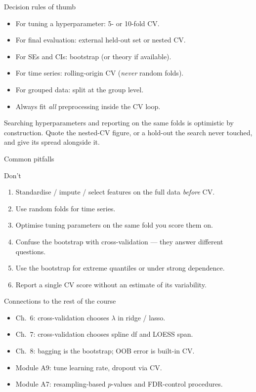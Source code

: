 \documentclass[aspectratio=169,11pt]{beamer}
\begin{document}
\begin{frame}{Decision rules of thumb}
  \begin{itemize}
    \item For tuning a hyperparameter: 5- or 10-fold CV.
    \item For final evaluation: external held-out set or nested CV.
    \item For SEs and CIs: bootstrap (or theory if available).
    \item For time series: rolling-origin CV (\emph{never} random
          folds).
    \item For grouped data: split at the group level.
    \item Always fit \emph{all} preprocessing inside the CV loop.
  \end{itemize}
  \begin{takeaway}
    Searching hyperparameters and reporting on the same folds is
    optimistic by construction. Quote the nested-CV figure, or a hold-out
    the search never touched, and give its spread alongside it.
  \end{takeaway}
\end{frame}

\begin{frame}{Common pitfalls}
  \begin{alertblock}{Don't}
    \begin{enumerate}
      \item Standardise / impute / select features on the full data
            \emph{before} CV.
      \item Use random folds for time series.
      \item Optimise tuning parameters on the same fold you score
            them on.
      \item Confuse the bootstrap with cross-validation --- they
            answer different questions.
      \item Use the bootstrap for extreme quantiles or under strong
            dependence.
      \item Report a single CV score without an estimate of its
            variability.
    \end{enumerate}
  \end{alertblock}
\end{frame}

\begin{frame}{Connections to the rest of the course}
  \begin{itemize}
    \item Ch.~6: cross-validation chooses $\lambda$ in ridge / lasso.
    \item Ch.~7: cross-validation chooses spline df and LOESS span.
    \item Ch.~8: bagging is the bootstrap; OOB error is built-in CV.
    \item Module A9: tune learning rate, dropout via CV.
    \item Module A7: resampling-based $p$-values and FDR-control
          procedures.
  \end{itemize}
\end{frame}
\end{document}
